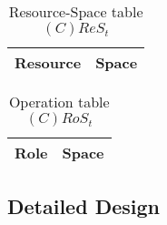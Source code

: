 \begin{table}[H]
	\centering
	\begin{tabular}{|p{4cm}|p{8cm}|}
			\hline
			\textbf{Resource} & \textbf{Space} \\
			\hline
		\end{tabular}
	\caption{Resource-Space table $(C)ReS_t$}
	\label{tab:crest}
\end{table}

\begin{table}[H]
	\centering
	\begin{tabular}{|p{4cm}|p{8cm}|}
			\hline
			\textbf{Role} & \textbf{Space} \\
			\hline
		\end{tabular}
	\caption{Operation table $(C)RoS_t$}
	\label{tab:cot}
\end{table}


\subsection{Detailed Design}








































